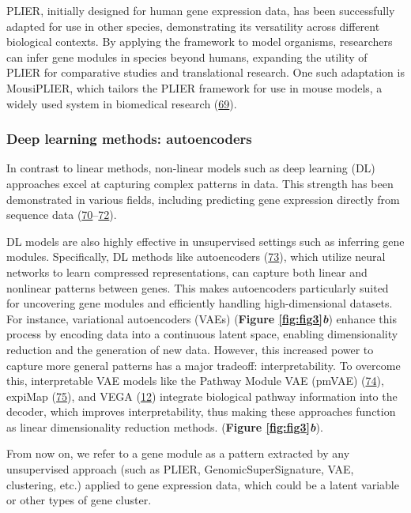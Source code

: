PLIER, initially designed for human gene expression data, has been successfully adapted for use in other species, demonstrating its versatility across different biological contexts.
By applying the framework to model organisms, researchers can infer gene modules in species beyond humans, expanding the utility of PLIER for comparative studies and translational research.
One such adaptation is MousiPLIER, which tailors the PLIER framework for use in mouse models, a widely used system in biomedical research (\protect\hyperlink{ref-1CDQw6VDO}{69}).

\hypertarget{deep-learning-methods-autoencoders}{%
\subsubsection{Deep learning methods: autoencoders}\label{deep-learning-methods-autoencoders}}

In contrast to linear methods, non-linear models such as deep learning (DL) approaches excel at capturing complex patterns in data.
This strength has been demonstrated in various fields, including predicting gene expression directly from sequence data (\protect\hyperlink{ref-1HNaN8NTb}{70}--\protect\hyperlink{ref-Gy0Zkruj}{72}).

DL models are also highly effective in unsupervised settings such as inferring gene modules.
Specifically, DL methods like autoencoders (\protect\hyperlink{ref-NLVTJ9Lj}{73}), which utilize neural networks to learn compressed representations, can capture both linear and nonlinear patterns between genes.
This makes autoencoders particularly suited for uncovering gene modules and efficiently handling high-dimensional datasets.
For instance, variational autoencoders (VAEs) (\textbf{Figure \ref{fig:fig3}\emph{b}}) enhance this process by encoding data into a continuous latent space, enabling dimensionality reduction and the generation of new data.
However, this increased power to capture more general patterns has a major tradeoff: interpretability.
To overcome this, interpretable VAE models like the Pathway Module VAE (pmVAE) (\protect\hyperlink{ref-nGVsOd2S}{74}), expiMap (\protect\hyperlink{ref-JkqcQgM7}{75}), and VEGA (\protect\hyperlink{ref-170T6ip47}{12}) integrate biological pathway information into the decoder, which improves interpretability, thus making these approaches function as linear dimensionality reduction methods.
(\textbf{Figure \ref{fig:fig3}\emph{b}}).

From now on, we refer to a gene module as a pattern extracted by any unsupervised approach (such as PLIER, GenomicSuperSignature, VAE, clustering, etc.) applied to gene expression data, which could be a latent variable or other types of gene cluster.

